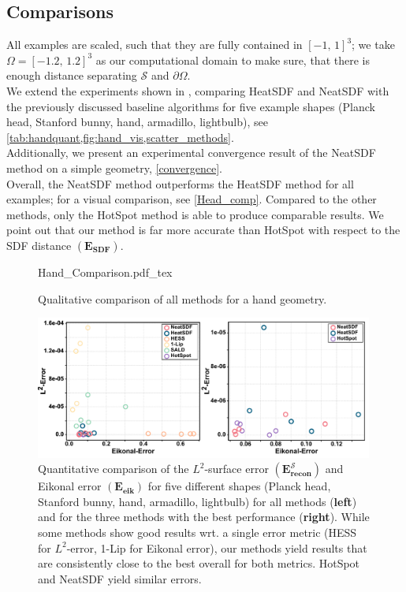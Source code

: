 \documentclass[draft,12pt,openany]{book}
\theoremstyle{plainnormal}
\theoremstyle{remark}
\begin{document}
\subsection{Comparisons}
All examples are scaled, such that they are fully contained in $[-1,\,1]^3$; we take $\Omega = [-1.2, \,1.2]^3$ as our computational domain to make sure, that there is enough distance separating $\mathcal S$ and $\partial \Omega$. \\
We extend the experiments shown in \cite{weidemaier2025sdfsunorientedpointclouds}, comparing HeatSDF and NeatSDF with the previously discussed baseline algorithms for five example shapes (Planck head, Stanford bunny, hand, armadillo, lightbulb), see \cref{tab:handquant,fig:hand_vis,scatter_methods}. \\
Additionally, we present an experimental convergence result of the NeatSDF method on a simple geometry, \cref{convergence}. \\
Overall, the NeatSDF method outperforms the HeatSDF method for all examples; for a visual comparison, see \cref{Head_comp}. Compared to the other methods, only the HotSpot method is able to produce comparable results. We point out that our method is far more accurate than HotSpot with respect to the SDF distance $\mathbf {(E_{SDF})}$.
\begin{figure}[t]
    \centering
    \begingroup
    \sffamily
    \def\svgwidth{0.95\textwidth}
    {Hand_Comparison.pdf_tex}
    \endgroup
    \caption{Qualitative comparison of all methods for a hand geometry.}
    \label{fig:hand_vis}
\end{figure}
\begin{figure}[b]
    \centering
    \includegraphics[width =0.99\textwidth]{Figures/method_comparison_lager_letters.pdf}
    
   
    \caption{Quantitative comparison of the $L^2$-surface error $\mathbf{(E_{recon}^{\mathcal{S}})}$ and Eikonal error $\mathbf{(E_{\text{eik}})}$ for five different shapes (Planck head, Stanford bunny, hand, armadillo, lightbulb) for all methods (\textbf{left}) and for the three methods with the best performance (\textbf{right}). While some methods show good results wrt. a single error metric (HESS for $L^2$-error, 1-Lip for Eikonal error), our methods yield results that are consistently close to the best overall for both metrics. HotSpot and NeatSDF yield similar errors.}  \label{scatter_methods}
\end{figure}
\end{document}
